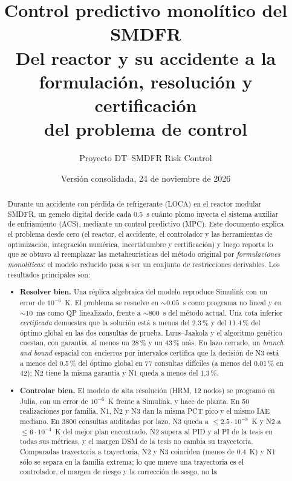 \documentclass[11pt,a4paper]{article}
\title{\color{accent}\bfseries Control predictivo monolítico del SMDFR\\[3pt]
\large\mdseries Del reactor y su accidente a la formulación, resolución y certificación\\
del problema de control}
\author{Proyecto DT--SMDFR Risk Control}
\date{Versión consolidada, 24 de noviembre de 2026}
\theoremstyle{plain}
\theoremstyle{definition}
\begin{document}
\maketitle

\begin{abstract}
\noindent Durante un accidente con pérdida de refrigerante (LOCA) en el reactor modular SMDFR,
un gemelo digital decide cada 0.5~s cuánto plomo inyecta el sistema auxiliar de enfriamiento
(ACS), mediante un control predictivo (MPC). Este documento explica el problema desde cero
(el reactor, el accidente, el controlador y las herramientas de optimización, integración
numérica, incertidumbre y certificación) y luego reporta lo que se obtuvo al reemplazar las
metaheurísticas del método original por \emph{formulaciones monolíticas}: el modelo reducido
pasa a ser un conjunto de restricciones derivables. Los resultados principales son:
\begin{itemize}
  \item \textbf{Resolver bien.} Una réplica algebraica del modelo reproduce Simulink con un
        error de $10^{-6}$~K. El problema se resuelve en $\sim0.05$~s como programa no lineal y en
        $\sim10$~ms como QP linealizado, frente a $\sim800$~s del método actual. Una cota
        inferior \emph{certificada} demuestra que la solución está a menos del 2.3\,\% y del
        11.4\,\% del óptimo global en las dos consultas de prueba. Luus--Jaakola y el algoritmo
        genético cuestan, con garantía, al menos un 28\,\% y un 43\,\% más. En lazo cerrado, un
        \emph{branch and bound} espacial con encierros por intervalos certifica que la decisión
        de N3 está a menos del 0.5\,\% del óptimo global en 77 consultas difíciles (a menos del
        0.01\,\% en 42); N2 tiene la misma garantía y N1 queda a menos del 1.3\,\%.
  \item \textbf{Controlar bien.} El modelo de alta resolución (HRM, 12 nodos) se programó en
        Julia, con un error de $10^{-6}$~K frente a Simulink, y hace de planta. En 50
        realizaciones por familia, N1, N2 y N3 dan la misma PCT pico y el mismo IAE mediano. En 3800 consultas
        auditadas por lazo, N3 queda a $\le2.5\cdot10^{-8}$~K y N2 a $\le6\cdot10^{-4}$~K del mejor plan
        encontrado. N2 supera al PID y al PI de la tesis en todas sus métricas, y el margen DSM
        de la tesis no cambia su trayectoria. Comparadas trayectoria a trayectoria, N2 y N3
        coinciden (menos de 0.4~K) y N1 sólo se separa en la familia extrema; lo que mueve una
        trayectoria es el controlador, el margen de riesgo y la corrección de sesgo, no la

\end{itemize}
\end{abstract}
\end{document}
